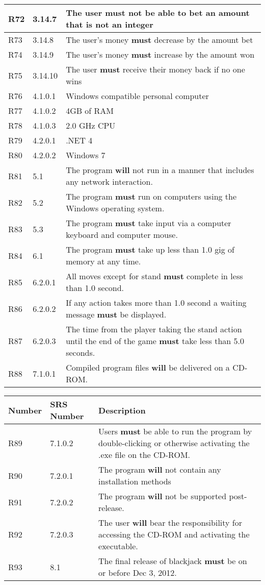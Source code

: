 \documentclass{article}
\begin{document}
\begin{tabular}{|l|l|p{5in}|}
R72 & 3.14.7 & The user \textbf{must} not be able to bet an amount that is not an integer \\\hline
R73 & 3.14.8 & The user’s money \textbf{must} decrease by the amount bet \\\hline
R74 & 3.14.9 & The user’s money \textbf{must} increase by the amount won \\\hline
R75 & 3.14.10 & The user \textbf{must} receive their money back if no one wins \\\hline
R76 & 4.1.0.1 &  Windows compatible personal computer \\\hline
R77 & 4.1.0.2 &  4GB of RAM \\\hline
R78 & 4.1.0.3 &  2.0 GHz CPU \\\hline
R79 & 4.2.0.1 &  .NET 4 \\\hline
R80 & 4.2.0.2 &  Windows 7 \\\hline
R81 & 5.1 & The program \textbf{will} not run in a manner that includes any network interaction. \\\hline
R82 & 5.2 & The program \textbf{must} run on computers using the Windows operating system. \\\hline
R83 & 5.3 & The program \textbf{must} take input via a computer keyboard and computer mouse. \\\hline
R84 & 6.1 & The program \textbf{must} take up less than 1.0 gig of memory at any time. \\\hline
R85 & 6.2.0.1 & All moves except for stand \textbf{must} complete in less than 1.0 second. \\\hline
R86 & 6.2.0.2 & If any action takes more than 1.0 second a waiting message \textbf{must} be displayed. \\\hline
R87 & 6.2.0.3 & The time from the player taking the stand action until the end of the game \textbf{must} take less than 5.0 seconds. \\\hline
R88 & 7.1.0.1 & Compiled program files \textbf{will} be delivered on a CD-ROM. \\\hline
\end{tabular}\newpage\begin{tabular}{|l|l|p{5in}|}\hline Number & SRS Number & Description\\\hline\hline
R89 & 7.1.0.2 & Users \textbf{must} be able to run the program by double-clicking or otherwise activating the .exe file on the CD-ROM.   \\\hline
R90 & 7.2.0.1 & The program \textbf{will} not contain any installation methods \\\hline
R91 & 7.2.0.2 & The program \textbf{will} not be supported post-release. \\\hline
R92 & 7.2.0.3 & The user \textbf{will} bear the responsibility for accessing the CD-ROM and activating the executable. \\\hline
R93 & 8.1 & The final release of blackjack \textbf{must} be on or before Dec 3, 2012. \\\hline
\end{tabular}
\newpage
\end{document}
